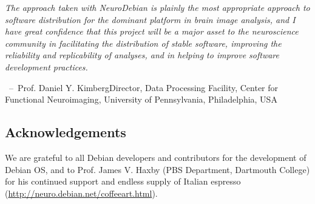 \documentclass[letterpaper,landscape]{report}
\newcommand{\epigraph}[3]{\textit{#1}\linebreak \vspace{-1.5em} \begin{flushright}\hspace{5em}\ --\ #2\linebreak\small{#3} \end{flushright}}
\begin{document}
\begin{multicols}{3}
\epigraph{The approach taken with NeuroDebian is plainly the most appropriate
approach to software distribution for the dominant platform in brain
image analysis, and I have great confidence that this project will be
a major asset to the neuroscience community in facilitating the
distribution of stable software, improving the reliability and
replicability of analyses, and in helping to improve software
development practices.}{Prof. Daniel Y. Kimberg}{Director, Data
Processing Facility, Center for Functional Neuroimaging, University of
Pennsylvania, Philadelphia, USA}

\subsection*{Acknowledgements}

We are grateful to all Debian developers and contributors for the
development of Debian OS, and to Prof. James V. Haxby (PBS Department,
Dartmouth College) for his continued support and endless supply of
Italian espresso (\url{http://neuro.debian.net/coffeeart.html}).

\end{multicols}
\end{document}
